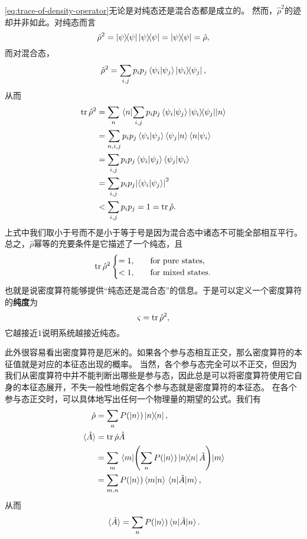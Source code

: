 \documentclass[hyperref, UTF8, a4paper]{ctexart}
\begin{document}
\eqref{eq:trace-of-density-operator}无论是对纯态还是混合态都是成立的。
然而，$\hat{\rho}^2$的迹却并非如此。对纯态而言
\[
    \hat{\rho}^2 = \dyad{\psi} \dyad{\psi} = \dyad{\psi} = \hat{\rho},
\]
而对混合态，
\[
    \hat{\rho}^2 = \sum_{i, j} p_i p_j \braket{\psi_i}{\psi_j} \dyad{\psi_i}{\psi_j},
\]
从而
\[
    \begin{aligned}
        \trace \hat{\rho}^2 &= \sum_n \mel{n}{\sum_{i, j} p_i p_j \braket{\psi_i}{\psi_j} \dyad{\psi_i}{\psi_j}}{n} \\
        &= \sum_{n, i, j} p_i p_j \braket{\psi_i}{\psi_j} \braket{\psi_j}{n} \braket{n}{\psi_i} \\
        &= \sum_{i, j} p_i p_j \braket{\psi_i}{\psi_j} \braket{\psi_j}{\psi_i} \\
        &=  \sum_{i, j} p_i p_j \abs{\braket{\psi_i}{\psi_j}}^2 \\
        &< \sum_{i, j} p_i p_j = 1 = \trace \hat{\rho}.
    \end{aligned}
\]
上式中我们取小于号而不是小于等于号是因为混合态中诸态不可能全部相互平行。
总之，$\hat{\rho}$幂等的充要条件是它描述了一个纯态，且
\begin{equation}
    \trace \hat{\rho}^2 \begin{cases}
        = 1, \quad & \text{for pure states}, \\
        < 1, \quad & \text{for mixed states}.
    \end{cases}
    \label{eq:inequality-of-mixed-state}
\end{equation}
也就是说密度算符能够提供“纯态还是混合态”的信息。于是可以定义一个密度算符的\textbf{纯度}为
\begin{equation}
    \varsigma = \trace \hat{\rho}^2,
\end{equation}
它越接近$1$说明系统越接近纯态。

此外很容易看出密度算符是厄米的。如果各个参与态相互正交，那么密度算符的本征值就是对应的本征态出现的概率。
当然，各个参与态完全可以不正交，但因为我们从密度算符中并不能判断出哪些是参与态，因此总是可以将密度算符使用它自身的本征态展开，不失一般性地假定各个参与态就是密度算符的本征态。
在各个参与态正交时，可以具体地写出任何一个物理量的期望的公式。我们有
\[
    \begin{aligned}
        \hat{\rho} &= \sum_n P(\ket{n}) \dyad{n}, \\
        \expval*{\hat{A}} &= \trace \hat{\rho} \hat{A} \\
        &= \sum_m \mel{m}{\left(\sum_n P(\ket{n}) \dyad{n} \hat{A} \right)}{m} \\
        &= \sum_{m, n} P(\ket{n}) \braket{m}{n} \mel{n}{\hat{A}}{m}, 
    \end{aligned}
\]
从而
\begin{equation}
    \expval*{\hat{A}} = \sum_n P(\ket{n}) \mel{n}{\hat{A}}{n}.
\end{equation}
\end{document}
